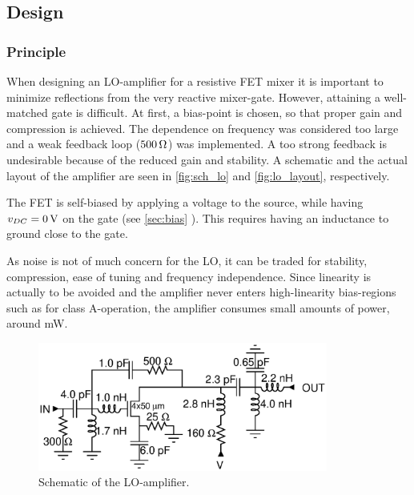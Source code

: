		\subsection{Design}
			\subsubsection{Principle}
				When designing an LO-amplifier for a resistive FET mixer it is important to minimize reflections from the very reactive mixer-gate. However, attaining a well-matched gate is difficult.\autocite{yhland1999} At first, a bias-point is chosen, so that proper gain and compression is achieved. The dependence on frequency was considered too large and a weak feedback loop ($\unit[500]{\Omega}$) was implemented. A too strong feedback is undesirable because of the reduced gain and stability. A schematic and the actual layout of the amplifier are seen in \autoref{fig:sch_lo} and \autoref{fig:lo_layout}, respectively.

				
	The FET is self-biased by applying a voltage to the source, while having $v_{DC}=\unit[0]{V}$ on the gate (see \ref{sec:bias} ). This requires having an inductance to ground close to the gate.

			 
			As noise is not of much concern for the LO, it can be traded for stability, compression, ease of tuning and frequency independence. Since linearity is actually to be avoided and the amplifier never enters high-linearity bias-regions such as for class A-operation, the amplifier consumes small amounts of power, around \unit[100]{mW}.




			\begin{figure}[hbt!]
				\centering
				\includegraphics[width=0.85\textwidth]{fig/amplifiers/lo/sch_lo}
				\caption[LO-amplifier schematic]{Schematic of the LO-amplifier.}\label{fig:sch_lo}
			\end{figure}


